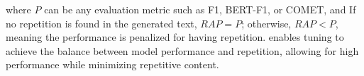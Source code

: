 \noindent
where $P$ can be any evaluation metric such as F1, BERT-F1, or COMET, and  
If no repetition is found in the generated text, $RAP = P$; otherwise, $RAP < P$, meaning the performance is penalized for having repetition. \rap enables tuning \rp to achieve the balance between model performance and repetition, allowing for high performance while minimizing repetitive content.





